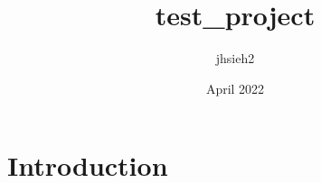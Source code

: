 \documentclass{article}
\title{test_project}
\author{jhsieh2 }
\date{April 2022}
\begin{document}
\maketitle

\section{Introduction}
\end{document}
